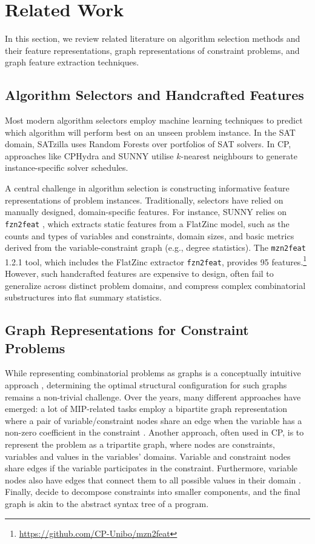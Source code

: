 \section{Related Work}
\label{sec:related-work}
In this section, we review related literature on algorithm selection methods and their feature representations, graph representations of constraint problems, and graph feature extraction techniques.

\subsection{Algorithm Selectors and Handcrafted Features}
Most modern algorithm selectors employ machine learning techniques to predict which algorithm will perform best on an unseen problem instance. In the SAT domain, SATzilla \citep{xu2012satzilla2012} uses Random Forests over portfolios of SAT solvers. In CP, approaches like CPHydra \citep{bridge2012case} and SUNNY \citep{amadini2014sunny} utilise $k$-nearest neighbours to generate instance-specific solver schedules.

A central challenge in algorithm selection is constructing informative feature representations of problem instances. Traditionally, selectors have relied on manually designed, domain-specific features. For instance, SUNNY relies on \texttt{fzn2feat} \citep{Amadini2014-fn}, which extracts static features from a FlatZinc model, such as the counts and types of variables and constraints, domain sizes, and basic metrics derived from the variable-constraint graph (e.g., degree statistics). The \texttt{mzn2feat} 1.2.1 tool, which includes the FlatZinc extractor \texttt{fzn2feat}, provides 95 features.\footnote{\url{https://github.com/CP-Unibo/mzn2feat}} However, such handcrafted features are expensive to design, often fail to generalize across distinct problem domains, and compress complex combinatorial substructures into flat summary statistics.

\subsection{Graph Representations for Constraint Problems}\label{sec:graph-representation}
While representing combinatorial problems as graphs is a conceptually intuitive approach \citep{bockmayr2005constraint}, determining the optimal structural configuration for such graphs remains a non-trivial challenge. Over the years, many different approaches have emerged: a lot of MIP-related tasks employ a bipartite graph representation where a pair of variable/constraint nodes share an edge when the variable has a non-zero coefficient in the constraint \citep{khalil2022mip}. Another approach, often used in CP, is to represent the problem as a tripartite graph, where nodes are constraints, variables and values in the variables' domains. Variable and constraint nodes share edges if the variable participates in the constraint. Furthermore, variable nodes also have edges that connect them to all possible values in their domain \citep{cappart2023combinatorial}. Finally, \citet{boisvert2024towards} decide to decompose constraints into smaller components, and the final graph is akin to the abstract syntax tree of a program.

